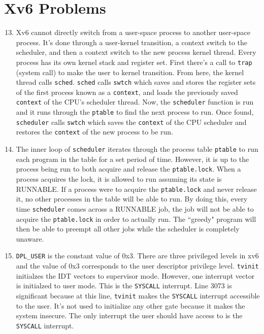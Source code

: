 \documentclass[12pt]{article}
\begin{document}
\section{Xv6 Problems}
\begin{enumerate}
	\setcounter{enumi}{12}
	\item Xv6 cannot directly switch from a user-space process to another user-space process. It's done through a user-kernel transition, a context switch to the scheduler, and then a context switch to the new process kernel thread. Every process has its own kernel stack and register set. First there's a call to \texttt{trap} (system call) to make the user to kernel transition. From here, the kernel thread calls \texttt{sched}. \texttt{sched} calls \texttt{swtch} which saves and stores the register sets of the first process known as a \texttt{context}, and loads the previously saved \texttt{context} of the CPU's scheduler thread. Now, the \texttt{scheduler} function is run and it runs through the \texttt{ptable} to find the next process to run. Once found, \texttt{scheduler} calls \texttt{swtch} which saves the \texttt{context} of the CPU scheduler and restores the \texttt{context} of the new process to be run. 
	
	\item	The inner loop of \texttt{scheduler} iterates through the process table \texttt{ptable} to run each program in the table for a set period of time. However, it is up to the process being run to both acquire and release the \texttt{ptable.lock}. When a process acquires the lock, it is allowed to run assuming its state is RUNNABLE. If a process were to acquire the \texttt{ptable.lock} and never release it, no other processes in the table will be able to run. By doing this, every time \texttt{scheduler} comes across a RUNNABLE job, the job will not be able to acquire the \texttt{ptable.lock} in order to actually run. The ``greedy" program will then be able to preempt all other jobs while the scheduler is completely unaware.
	
	\item \texttt{DPL\_USER} is the constant value of 0x3. There are three privileged levels in xv6 and the value of 0x3 corresponds to the user descriptor privilege level. \texttt{tvinit} initialzes the IDT vectors to supervisor mode. However, one interrupt vector is initialzed to user mode. This is the \texttt{SYSCALL} interrupt. Line 3073 is significant because at this line, \texttt{tvinit} makes the \texttt{SYSCALL} interrupt accessible to the user. It's not used to initialize any other gate because it makes the system insecure. The only interrupt the user should have access to is the \texttt{SYSCALL} interrupt.
	

\end{enumerate}
\end{document}
